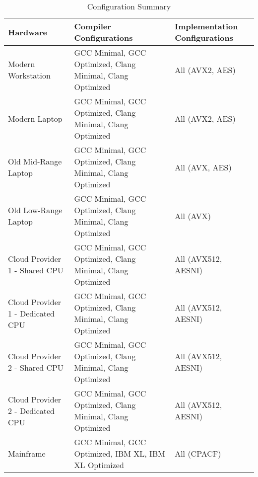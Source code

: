 \begin{table}[]
    \centering
    \begin{tabular}{l|p{4cm}|p{3cm}}
        Hardware & Compiler Configurations & Implementation Configurations\\
        \hline
        Modern Workstation & GCC Minimal, GCC Optimized, Clang Minimal, Clang Optimized & All (AVX2, AES)\\
        Modern Laptop & GCC Minimal, GCC Optimized, Clang Minimal, Clang Optimized & All (AVX2, AES) \\
        Old Mid-Range Laptop & GCC Minimal, GCC Optimized, Clang Minimal, Clang Optimized & All (AVX, AES)\\
        Old Low-Range Laptop & GCC Minimal, GCC Optimized, Clang Minimal, Clang Optimized & All (AVX)\\
        Cloud Provider 1 - Shared CPU & GCC Minimal, GCC Optimized, Clang Minimal, Clang Optimized & All (AVX512, AESNI)\\
        Cloud Provider 1 - Dedicated CPU & GCC Minimal, GCC Optimized, Clang Minimal, Clang Optimized & All (AVX512, AESNI)\\
        Cloud Provider 2 - Shared CPU & GCC Minimal, GCC Optimized, Clang Minimal, Clang Optimized & All (AVX512, AESNI)\\
        Cloud Provider 2 - Dedicated CPU & GCC Minimal, GCC Optimized, Clang Minimal, Clang Optimized & All (AVX512, AESNI)\\
        Mainframe & GCC Minimal, GCC Optimized, IBM XL, IBM XL Optimized & All (CPACF)\\
    \end{tabular}
    \caption{Configuration Summary}
    \label{table:method:configuration-summary}
\end{table}